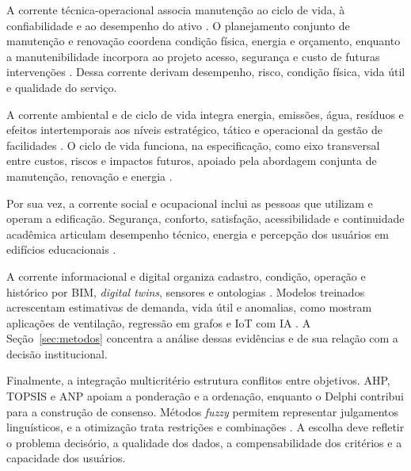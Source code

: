 A corrente técnica-operacional associa manutenção ao ciclo de vida, à confiabilidade e ao desempenho do ativo \parencite{nageli_ciclovida_2019,othman_manutenibilidadeesi_2023}. O planejamento conjunto de manutenção e renovação coordena condição física, energia e orçamento, enquanto a manutenibilidade incorpora ao projeto acesso, segurança e custo de futuras intervenções \parencite{nageli_ciclovida_2019,othman_manutenibilidadeesi_2023,chew_manutenibilidadeverde_2016,conejos_verticalgreenery_2019}. Dessa corrente derivam desempenho, risco, condição física, vida útil e qualidade do serviço.

A corrente ambiental e de ciclo de vida integra energia, emissões, água, resíduos e efeitos intertemporais aos níveis estratégico, tático e operacional da gestão de facilidades \parencite{nielsen_sustentabilidadefm_2016,opoku_futurofm_2022,okoro_sustainablefm_2023}. O ciclo de vida funciona, na especificação, como eixo transversal entre custos, riscos e impactos futuros, apoiado pela abordagem conjunta de manutenção, renovação e energia \parencite{nageli_ciclovida_2019}.

Por sua vez, a corrente social e ocupacional inclui as pessoas que utilizam e operam a edificação. Segurança, conforto, satisfação, acessibilidade e continuidade acadêmica articulam desempenho técnico, energia e percepção dos usuários em edifícios educacionais \parencite{nielsen_sustentabilidadefm_2016,alfalah_frameworkeducacional_2022}.

A corrente informacional e digital organiza cadastro, condição, operação e histórico por BIM, \textit{digital twins}, sensores e ontologias \parencite{deng_bimdigitaltwins_2021,gispert_ontologiaativos_2025,goretti_bimoem_2023}. Modelos treinados acrescentam estimativas de demanda, vida útil e anomalias, como mostram aplicações de ventilação, regressão em grafos e IoT com IA \parencite{motuziene_ventilacaoia_2025,wu_gnnvidautil_2025,das_iotai_2025}. A Seção~\ref{sec:metodos} concentra a análise dessas evidências e de sua relação com a decisão institucional.

Finalmente, a integração multicritério estrutura conflitos entre objetivos. AHP, TOPSIS e ANP apoiam a ponderação e a ordenação, enquanto o Delphi contribui para a construção de consenso. Métodos \textit{fuzzy} permitem representar julgamentos linguísticos, e a otimização trata restrições e combinações \parencite{alfalah_frameworkeducacional_2022,naji_campusdelphi_2023,masmoudi_ahptopsis_2026}. A escolha deve refletir o problema decisório, a qualidade dos dados, a compensabilidade dos critérios e a capacidade dos usuários.
